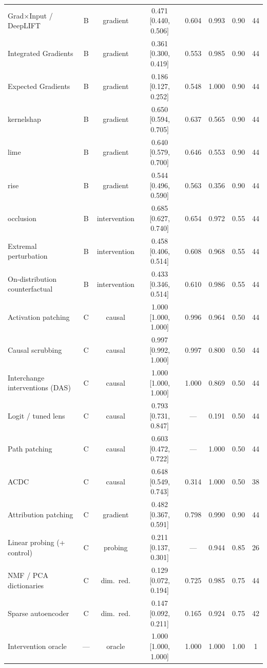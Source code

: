 \begin{table}[t]
\begin{tabularx}{\textwidth}{@{}Xccccccc@{}}
Grad$\times$Input / DeepLIFT & B & gradient & 0.471 [0.440, 0.506] & 0.604 & 0.993 & 0.90 & 44 \\
Integrated Gradients & B & gradient & 0.361 [0.300, 0.419] & 0.553 & 0.985 & 0.90 & 44 \\
Expected Gradients & B & gradient & 0.186 [0.127, 0.252] & 0.548 & 1.000 & 0.90 & 44 \\
kernelshap & B & gradient & 0.650 [0.594, 0.705] & 0.637 & 0.565 & 0.90 & 44 \\
lime & B & gradient & 0.640 [0.579, 0.700] & 0.646 & 0.553 & 0.90 & 44 \\
rise & B & gradient & 0.544 [0.496, 0.590] & 0.563 & 0.356 & 0.90 & 44 \\
occlusion & B & intervention & 0.685 [0.627, 0.740] & 0.654 & 0.972 & 0.55 & 44 \\
Extremal perturbation & B & intervention & 0.458 [0.406, 0.514] & 0.608 & 0.968 & 0.55 & 44 \\
On-distribution counterfactual & B & intervention & 0.433 [0.346, 0.514] & 0.610 & 0.986 & 0.55 & 44 \\
\midrule
Activation patching & C & causal & 1.000 [1.000, 1.000] & 0.996 & 0.964 & 0.50 & 44 \\
Causal scrubbing & C & causal & 0.997 [0.992, 1.000] & 0.997 & 0.800 & 0.50 & 44 \\
Interchange interventions (DAS) & C & causal & 1.000 [1.000, 1.000] & 1.000 & 0.869 & 0.50 & 44 \\
Logit / tuned lens & C & causal & 0.793 [0.731, 0.847] & --- & 0.191 & 0.50 & 44 \\
Path patching & C & causal & 0.603 [0.472, 0.722] & --- & 1.000 & 0.50 & 44 \\
ACDC & C & causal & 0.648 [0.549, 0.743] & 0.314 & 1.000 & 0.50 & 38 \\
Attribution patching & C & gradient & 0.482 [0.367, 0.591] & 0.798 & 0.990 & 0.90 & 44 \\
Linear probing (+ control) & C & probing & 0.211 [0.137, 0.301] & --- & 0.944 & 0.85 & 26 \\
NMF / PCA dictionaries & C & dim.\ red. & 0.129 [0.072, 0.194] & 0.725 & 0.985 & 0.75 & 44 \\
Sparse autoencoder & C & dim.\ red. & 0.147 [0.092, 0.211] & 0.165 & 0.924 & 0.75 & 42 \\
\midrule
Intervention oracle & --- & oracle & 1.000 [1.000, 1.000] & 1.000 & 1.000 & 1.00 & 1 \\
\bottomrule
\end{tabularx}
\end{table}

